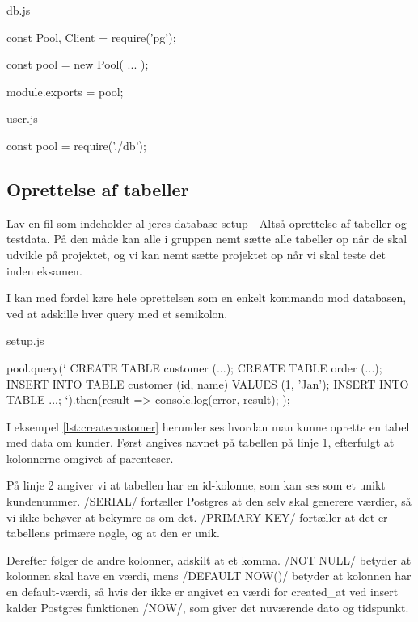\documentclass[english,course]{lecture}
\begin{document}
\begin{listing}[H]
\caption{db.js}
\begin{jscode}
const { Pool, Client } = require('pg');

const pool = new Pool({
  ...
});

module.exports = pool;
\end{jscode}
\end{listing}

\begin{listing}[H]
\caption{user.js}
\begin{jscode}
const pool = require('./db');
\end{jscode}
\end{listing}

\subsection{Oprettelse af tabeller}

Lav en fil som indeholder al jeres database setup - Altså oprettelse af tabeller og testdata. På den måde kan alle i gruppen nemt sætte alle tabeller op når de skal udvikle på projektet, og vi kan nemt sætte projektet op når vi skal teste det inden eksamen.

I kan med fordel køre hele oprettelsen som en enkelt kommando mod databasen, ved at adskille hver query med et semikolon.

\begin{listing}[H]
\caption{setup.js}
\begin{jscode}
pool.query(`
	CREATE TABLE customer (...);
	CREATE TABLE order (...);
	INSERT INTO TABLE customer (id, name) VALUES (1, 'Jan');
	INSERT INTO TABLE ...;
`).then(result => {
	console.log(error, result);
});
\end{jscode}
\end{listing}

I eksempel \ref{lst:createcustomer} herunder ses hvordan man kunne oprette en tabel med data om kunder. Først angives navnet på tabellen på linje 1, efterfulgt at kolonnerne omgivet af parenteser.

På linje 2 angiver vi at tabellen har en id-kolonne, som kan ses som et unikt kundenummer. \sqlinline/SERIAL/ fortæller Postgres at den selv skal generere værdier, så vi ikke behøver at bekymre os om det. \sqlinline/PRIMARY KEY/ fortæller at det er tabellens primære nøgle, og at den er unik. 

Derefter følger de andre kolonner, adskilt at et komma. \sqlinline/NOT NULL/ betyder at kolonnen skal have en værdi, mens \sqlinline/DEFAULT NOW()/ betyder at kolonnen har en default-værdi, så hvis der ikke er angivet en værdi for created\_at ved insert kalder Postgres funktionen \sqlinline/NOW/, som giver det nuværende dato og tidspunkt.
\end{document}
